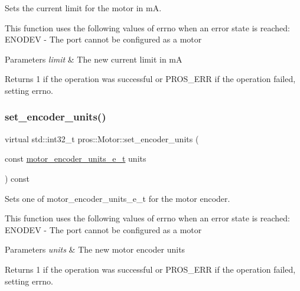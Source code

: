 Sets the current limit for the motor in mA. 

This function uses the following values of errno when an error state is reached\+: E\+N\+O\+D\+EV -\/ The port cannot be configured as a motor


\begin{DoxyParams}{Parameters}
{\em limit} & The new current limit in mA\\
\hline
\end{DoxyParams}
\begin{DoxyReturn}{Returns}
1 if the operation was successful or P\+R\+O\+S\+\_\+\+E\+RR if the operation failed, setting errno. 
\end{DoxyReturn}
\mbox{\label{classpros_1_1Motor_a2d2fea8d5967d1e41471111aa89afd84}} 
\subsubsection{\texorpdfstring{set\+\_\+encoder\+\_\+units()}{set\_encoder\_units()}}
{\footnotesize\ttfamily virtual std\+::int32\+\_\+t pros\+::\+Motor\+::set\+\_\+encoder\+\_\+units (\begin{DoxyParamCaption}\item[{const \hyperlink{motors_8h_a6677ba23760c558fd8b7b4e1e00a6123}{motor\+\_\+encoder\+\_\+units\+\_\+e\+\_\+t}}]{units }\end{DoxyParamCaption}) const\hspace{0.3cm}{\ttfamily [virtual]}}



Sets one of motor\+\_\+encoder\+\_\+units\+\_\+e\+\_\+t for the motor encoder. 

This function uses the following values of errno when an error state is reached\+: E\+N\+O\+D\+EV -\/ The port cannot be configured as a motor


\begin{DoxyParams}{Parameters}
{\em units} & The new motor encoder units\\
\hline
\end{DoxyParams}
\begin{DoxyReturn}{Returns}
1 if the operation was successful or P\+R\+O\+S\+\_\+\+E\+RR if the operation failed, setting errno. 
\end{DoxyReturn}
\mbox{\label{classpros_1_1Motor_a3adf8b737ad2e4ebb5f000401c536fed}} 
